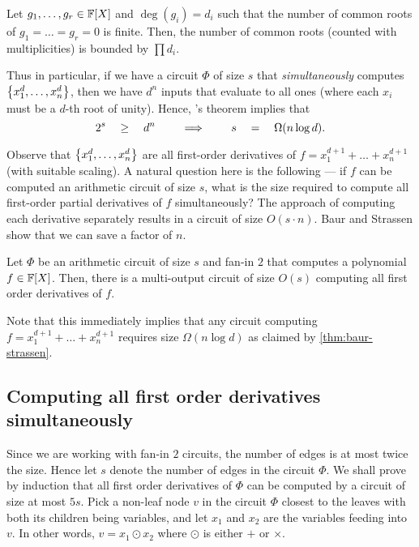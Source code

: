 \begin{theorem}
  Let $g_1,\dots, g_r \in \mathbb{F}[X]$ and $\deg(g_i) = d_i$ such that the number of common roots of $g_1=\dots=g_r = 0$ is finite.
Then, the number of common roots (counted with multiplicities) is bounded by $\prod d_i$.
\end{theorem}

Thus in particular, if we have a circuit $\Phi$ of size $s$ that \emph{simultaneously} computes $\left\{x_1^d, \dots,x_n^d\right\}$, then we have $d^n$ inputs that evaluate to all ones (where each $x_i$ must be  a $d$-th root of unity). 
Hence, \Bezout's theorem implies that
$$
2^s\quad \geq \quad d^n \quad \quad\implies\quad \quad s \quad = \quad \Omega(n\log d).
$$

Observe that $\left\{x_1^d,\dots, x_n^d\right\}$ are all first-order derivatives of $f = x_1^{d+1}+\dots+x_n^{d+1}$ (with suitable scaling). 
A natural question here is the following --- if $f$ can be computed an arithmetic circuit of size $s$, what is the size required to compute all first-order partial derivatives of $f$ simultaneously? 
The \naive approach of computing each derivative separately results in a circuit of size $O(s\cdot n)$. 
Baur and Strassen \cite{BS83} show that we can save a factor of $n$.

\begin{lemma}[\cite{BS83}]\label{lem:baur-strassen}
  Let $\Phi$ be an arithmetic circuit of size $s$ and fan-in $2$ that computes a polynomial $f\in \mathbb{F}[X]$. 
Then, there is a multi-output circuit  of size $O(s)$ computing all first order derivatives of $f$.
\end{lemma}

Note that this immediately implies that any circuit computing $f = x_1^{d+1} + \dots + x_n^{d+1}$ requires size $\Omega(n\log d)$ as claimed by \autoref{thm:baur-strassen}. 


\subsection{Computing all first order derivatives simultaneously}

Since we are working with fan-in $2$ circuits, the number of edges is at most twice the size. 
Hence let $s$ denote the number of edges in the circuit $\Phi$. We shall prove by induction that all first order derivatives of $\Phi$ can be computed by a circuit of size at most $5s$.
Pick a non-leaf node $v$ in the circuit $\Phi$ closest to the leaves with both its children being variables, and let $x_1$ and $x_2$ are the variables feeding into $v$.
In other words, $v = x_1 \odot x_2$ where $\odot$ is either $+$ or $\times$.

